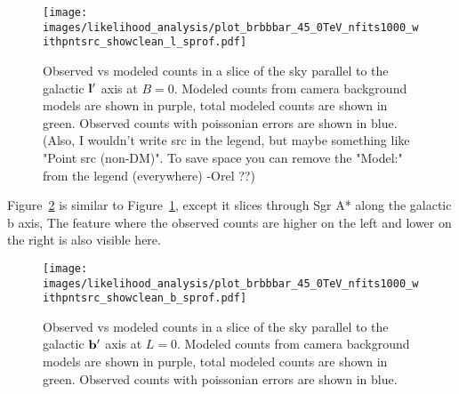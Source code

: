  \begin{figure}[h]
    \centering
    \texttt{[image: images/likelihood\_analysis/plot\_brbbbar\_45\_0TeV\_nfits1000\_withpntsrc\_showclean\_l\_sprof.pdf]}
    \caption[Galactic Center Profile vs Galactic l]{
      Observed vs modeled counts in a slice of the sky parallel to the galactic $\mathbf{l'}$ axis at $B=0$.
      Modeled counts from camera background models are shown in purple, total modeled counts are shown in green.
      Observed counts with poissonian errors are shown in blue.
      {\color{red}(Also, I wouldn't write src in the legend, but maybe something like "Point src (non-DM)". To save space you can remove the "Model:" from the legend (everywhere) -Orel ??)}
    }
    \label{fig:gc_profile_gal_l}
  \end{figure}

  Figure~\ref{fig:gc_profile_gal_b} is similar to Figure~\ref{fig:gc_profile_gal_l}, except it slices through Sgr A* along the galactic b axis,
  The feature where the observed counts are higher on the left and lower on the right is also visible here.

  \begin{figure}[h]
    \centering
    \texttt{[image: images/likelihood\_analysis/plot\_brbbbar\_45\_0TeV\_nfits1000\_withpntsrc\_showclean\_b\_sprof.pdf]}
    \caption[Galactic Center Profile vs Galactic b]{
      Observed vs modeled counts in a slice of the sky parallel to the galactic $\mathbf{b'}$ axis at $L=0$.
      Modeled counts from camera background models are shown in purple, total modeled counts are shown in green.
      Observed counts with poissonian errors are shown in blue.
    }
    \label{fig:gc_profile_gal_b}
  \end{figure}


